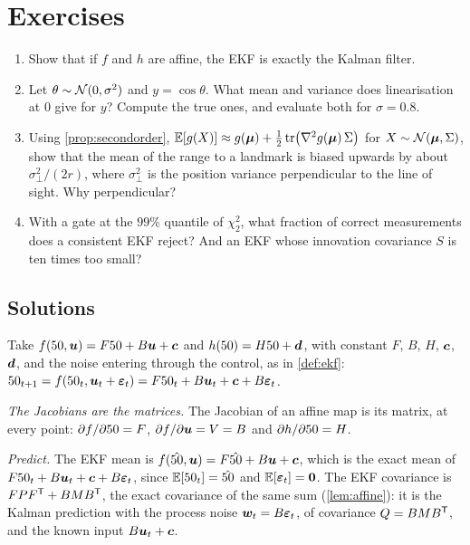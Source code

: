\FloatBarrier
\section*{Exercises}

\begin{enumerate}[label=\textbf{4.\arabic*},ref=4.\arabic*]
\item\label{ex:ekfexact} Show that if $f$ and $h$ are affine, the EKF is
  exactly the Kalman filter.
\item\label{ex:cosvar} Let $\theta\sim\mathcal{N}(0,\sigma^2)$ and
  $y=\cos\theta$. What mean and variance does linearisation at $0$ give for
  $y$? Compute the true ones, and evaluate both for $\sigma=0.8$.
\item\label{ex:rangebias} Using \cref{prop:secondorder},
$\mathbb{E}[g(X)]\approx g(\bm{\mu})+\tfrac12\operatorname{tr}\bigl(\nabla^2g(\bm{\mu})\,\Sigma\bigr)$
for $X\sim\mathcal{N}(\bm{\mu},\Sigma)$, show that the mean of the range to a landmark is biased upwards by about
  $\sigma_\perp^2/(2r)$, where $\sigma_\perp^2$ is the position variance
  perpendicular to the line of sight. Why perpendicular?
\item\label{ex:gate} With a gate at the $99\%$ quantile of $\chi^2_2$,
  what fraction of correct measurements does a consistent EKF reject? And
  an EKF whose innovation covariance $S$ is ten times too small?
\end{enumerate}

\subsection*{Solutions}

 Take $f(50,\bm{u})=F50+B\bm{u}+\bm{c}$ and $h(50)=H50+\bm{d}$,
with constant $F$, $B$, $H$, $\bm{c}$, $\bm{d}$, and the noise entering
through the control, as in \cref{def:ekf}: $50_{t+1}=f(50_t,\bm{u}_t+
\bm{\varepsilon}_t)=F50_t+B\bm{u}_t+\bm{c}+B\bm{\varepsilon}_t$.

\emph{The Jacobians are the matrices.} The Jacobian of an affine map is
its matrix, at every point: $\partial f/\partial50=F$,
$\partial f/\partial\bm{u}=V=B$ and $\partial h/\partial50=H$.

\emph{Predict.} The EKF mean is $f(\hat{50},\bm{u})=F\hat{50}+B\bm{u}+\bm{c}$, which is
the exact mean of $F50_t+B\bm{u}_t+\bm{c}+B\bm{\varepsilon}_t$, since
$\mathbb{E}[50_t]=\hat{50}$ and $\mathbb{E}[\bm{\varepsilon}_t]=\bm{0}$. The EKF covariance is
$FPF^{\mathsf{T}}+BMB^{\mathsf{T}}$, the exact covariance of the same sum (\cref{lem:affine}):
it is the Kalman prediction with the process noise $\bm{w}_t=B\bm{\varepsilon}_t$,
of covariance $Q=BMB^{\mathsf{T}}$, and the known input $B\bm{u}_t+\bm{c}$.

